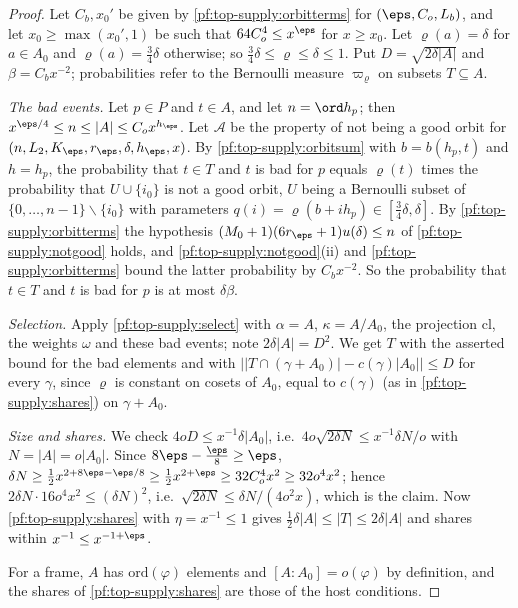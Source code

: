 \begin{proof}
Let $C_b,x_0'$ be given by \cref{pf:top-supply:orbitterms} for $(\eps,C_o,L_b)$, and let $x_0\ge\max(x_0',1)$ be such that
$64C_o^4\le x^\eps$ for $x\ge x_0$. Let $\varrho(a)=\delta$ for $a\in A_0$ and $\varrho(a)=\frac34\delta$ otherwise; so
$\frac34\delta\le\varrho\le\delta\le1$. Put $D=\sqrt{2\delta|A|}$ and $\beta=C_bx^{-2}$; probabilities refer to the Bernoulli
measure $\varpi_\varrho$ on subsets $T\subseteq A$.

\emph{The bad events.} Let $p\in P$ and $t\in A$, and let $n=\ord h_p$; then $x^{\eps/4}\le n\le|A|\le C_ox^{h_\eps}$. Let
$\mathcal A$ be the property of not being a good orbit for $(n,L_2,K_\eps,r_\eps,\delta,h_\eps,x)$. By
\cref{pf:top-supply:orbitsum} with $b=b(h_p,t)$ and $h=h_p$, the probability that $t\in T$ and $t$ is bad for $p$ equals
$\varrho(t)$ times the probability that $U\cup\{i_0\}$ is not a good orbit, $U$ being a Bernoulli subset of
$\{0,\dots,n-1\}\smallsetminus\{i_0\}$ with parameters $q(i)=\varrho(b+ih_p)\in[\frac34\delta,\delta]$. By
\cref{pf:top-supply:orbitterms} the hypothesis $(M_0+1)(6r_\eps+1)u(\delta)\le n$ of \cref{pf:top-supply:notgood} holds, and
\cref{pf:top-supply:notgood}(ii) and \cref{pf:top-supply:orbitterms} bound the latter probability by $C_bx^{-2}$. So the
probability that $t\in T$ and $t$ is bad for $p$ is at most $\delta\beta$.

\emph{Selection.} Apply \cref{pf:top-supply:select} with $\alpha=A$, $\kappa=A/A_0$, the projection $\mathrm{cl}$, the
weights $\omega$ and these bad events; note $2\delta|A|=D^2$. We get $T$ with the asserted bound for the bad elements and
with $\big||T\cap(\gamma+A_0)|-c(\gamma)|A_0|\big|\le D$ for every $\gamma$, since $\varrho$ is constant on cosets of $A_0$, equal to
$c(\gamma)$ (as in \cref{pf:top-supply:shares}) on $\gamma+A_0$.

\emph{Size and shares.} We check $4oD\le x^{-1}\delta|A_0|$, i.e.\ $4o\sqrt{2\delta N}\le x^{-1}\delta N/o$ with $N=|A|=o|A_0|$.
Since $8\eps-\frac\eps8\ge\eps$, $\delta N\ge\frac12x^{2+8\eps-\eps/8}\ge\frac12x^{2+\eps}\ge32C_o^4x^2\ge32o^4x^2$; hence
$2\delta N\cdot16o^4x^2\le(\delta N)^2$, i.e.\ $\sqrt{2\delta N}\le\delta N/(4o^2x)$, which is the claim. Now
\cref{pf:top-supply:shares} with $\eta=x^{-1}\le1$ gives $\frac12\delta|A|\le|T|\le2\delta|A|$ and shares within
$x^{-1}\le x^{-1+\eps}$.

For a frame, $A$ has $\mathrm{ord}(\varphi)$ elements and $[A:A_0]=o(\varphi)$ by definition, and the shares of
\cref{pf:top-supply:shares} are those of the host conditions.
\end{proof}

